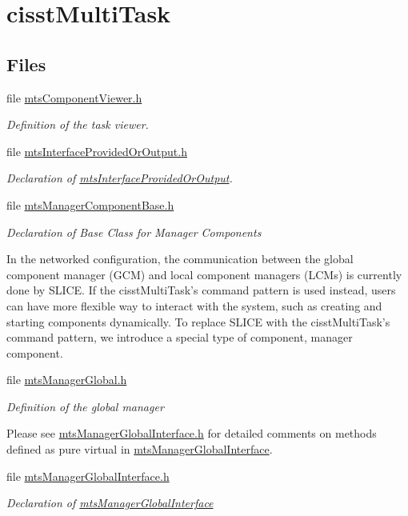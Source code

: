 \hypertarget{group__cisst_multi_task}{\section{cisst\-Multi\-Task}
\label{group__cisst_multi_task}
}
\subsection*{Files}
\begin{DoxyCompactItemize}
\item 
file \hyperlink{mts_component_viewer_8h}{mts\-Component\-Viewer.\-h}
\begin{DoxyCompactList}\small\item\em Definition of the task viewer. \end{DoxyCompactList}\item 
file \hyperlink{mts_interface_provided_or_output_8h}{mts\-Interface\-Provided\-Or\-Output.\-h}
\begin{DoxyCompactList}\small\item\em Declaration of \hyperlink{classmts_interface_provided_or_output}{mts\-Interface\-Provided\-Or\-Output}. \end{DoxyCompactList}\item 
file \hyperlink{mts_manager_component_base_8h}{mts\-Manager\-Component\-Base.\-h}
\begin{DoxyCompactList}\small\item\em Declaration of Base Class for Manager Components

In the networked configuration, the communication between the global component manager (G\-C\-M) and local component managers (L\-C\-Ms) is currently done by S\-L\-I\-C\-E. If the cisst\-Multi\-Task's command pattern is used instead, users can have more flexible way to interact with the system, such as creating and starting components dynamically. To replace S\-L\-I\-C\-E with the cisst\-Multi\-Task's command pattern, we introduce a special type of component, manager component. \end{DoxyCompactList}\item 
file \hyperlink{mts_manager_global_8h}{mts\-Manager\-Global.\-h}
\begin{DoxyCompactList}\small\item\em Definition of the global manager

Please see \hyperlink{mts_manager_global_interface_8h}{mts\-Manager\-Global\-Interface.\-h} for detailed comments on methods defined as pure virtual in \hyperlink{classmts_manager_global_interface}{mts\-Manager\-Global\-Interface}. \end{DoxyCompactList}\item 
file \hyperlink{mts_manager_global_interface_8h}{mts\-Manager\-Global\-Interface.\-h}
\begin{DoxyCompactList}\small\item\em Declaration of \hyperlink{classmts_manager_global_interface}{mts\-Manager\-Global\-Interface}


\end{DoxyCompactList}
\end{DoxyCompactItemize}

